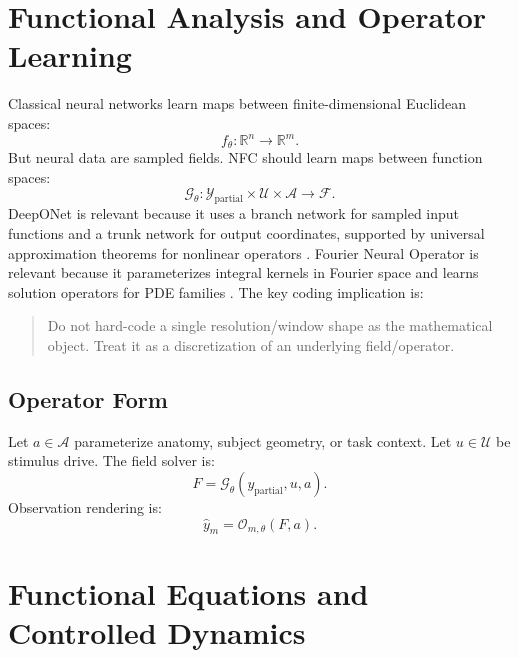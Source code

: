 \documentclass[11pt]{article}
\newcommand{\R}{\mathbb{R}}
\newcommand{\Obs}{\mathcal{O}}
\newcommand{\Operator}{\mathcal{G}_\theta}
\begin{document}
\section{Functional Analysis and Operator Learning}

Classical neural networks learn maps between finite-dimensional Euclidean spaces:
\begin{equation}
f_\theta:\R^n\rightarrow \R^m.
\end{equation}
But neural data are sampled fields. NFC should learn maps between function spaces:
\begin{equation}
\Operator:\mathcal{Y}_{\mathrm{partial}}\times \mathcal{U}\times \mathcal{A}\rightarrow \mathcal{F}.
\end{equation}
DeepONet is relevant because it uses a branch network for sampled input functions and a trunk network for output coordinates, supported by universal approximation theorems for nonlinear operators \cite{deeponet}. Fourier Neural Operator is relevant because it parameterizes integral kernels in Fourier space and learns solution operators for PDE families \cite{fno}. The key coding implication is:
\begin{quote}
Do not hard-code a single resolution/window shape as the mathematical object. Treat it as a discretization of an underlying field/operator.
\end{quote}

\subsection{Operator Form}

Let $a\in \mathcal{A}$ parameterize anatomy, subject geometry, or task context. Let $u\in\mathcal{U}$ be stimulus drive. The field solver is:
\begin{equation}
F = \mathcal{G}_\theta(y_{\mathrm{partial}},u,a).
\end{equation}
Observation rendering is:
\begin{equation}
\hat{y}_m = \Obs_{m,\theta}(F,a).
\end{equation}

\section{Functional Equations and Controlled Dynamics}
\end{document}
